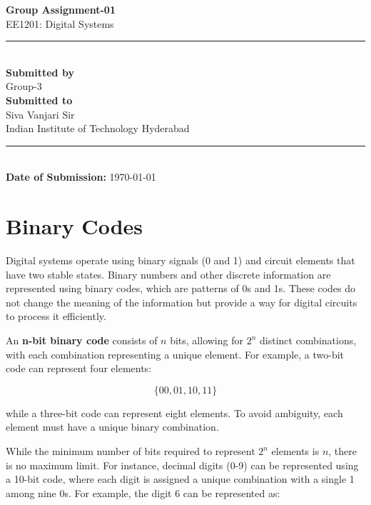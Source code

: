 \documentclass[a4paper,12pt]{article}
\begin{document}
\begin{titlepage}
    \centering
    
    \vspace{1cm}
    
    {\Huge \textbf{Group Assignment-01}}\\[1cm]
    {\LARGE EE1201: Digital Systems}\\[1.5cm]
    
    \rule{\linewidth}{0.5mm}\\[0.5cm]
    {\Large \textbf{Submitted by}}\\[0.3cm]
    {\large Group-3}\\[1cm]
   
    {\Large \textbf{Submitted to}}\\[0.3cm]
    {\large Siva Vanjari Sir}\\
    {\large Indian Institute of Technology Hyderabad}\\[1.5cm]
    
    \rule{\linewidth}{0.5mm}\\[1.5cm]
    {\large \textbf{Date of Submission:} \today}\\[2cm]
    
    \vfill

\end{titlepage}

\newpage
\section{Binary Codes}

Digital systems operate using binary signals (0 and 1) and circuit elements that have two stable states. Binary numbers and other discrete information are represented using binary codes, which are patterns of 0s and 1s. These codes do not change the meaning of the information but provide a way for digital circuits to process it efficiently.

An \textbf{n-bit binary code} consists of $n$ bits, allowing for $2^n$ distinct combinations, with each combination representing a unique element. For example, a two-bit code can represent four elements:

\[
\{00, 01, 10, 11\}
\]

while a three-bit code can represent eight elements. To avoid ambiguity, each element must have a unique binary combination.

While the minimum number of bits required to represent $2^n$ elements is $n$, there is no maximum limit. For instance, decimal digits (0-9) can be represented using a 10-bit code, where each digit is assigned a unique combination with a single 1 among nine 0s. For example, the digit 6 can be represented as:
\end{document}
